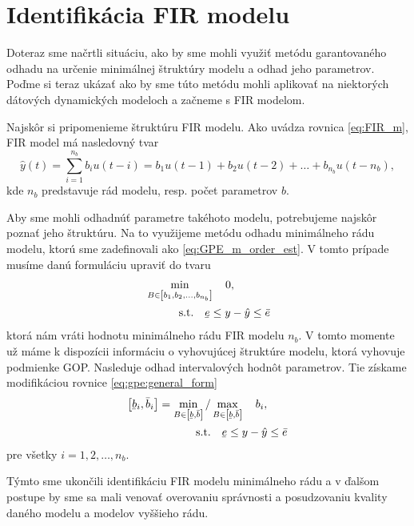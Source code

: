 \section{Identifikácia FIR modelu}
Doteraz sme načrtli situáciu, ako by sme mohli využiť metódu garantovaného odhadu na určenie minimálnej štruktúry modelu a odhad jeho parametrov. Poďme si teraz ukázať ako by sme túto metódu mohli aplikovať na niektorých dátových dynamických modeloch a začneme s FIR modelom.

Najskôr si pripomenieme štruktúru FIR modelu. Ako uvádza rovnica \ref{eq:FIR_m}, FIR model má nasledovný tvar
\begin{equation*}
	\hat{y}(t) = \sum_{i=1}^{n_b} b_{i}u(t-i) = b_{1}u(t-1) + b_{2}u(t-2) + \dots + b_{n_b}u(t-n_b),
\end{equation*}
kde $ n_b $ predstavuje rád modelu, resp. počet parametrov $ b $. 

Aby sme mohli odhadnúť parametre takéhoto modelu, potrebujeme najskôr poznať jeho štruktúru. Na to využijeme metódu odhadu minimálneho rádu modelu, ktorú sme zadefinovali ako \ref{eq:GPE_m_order_est}. V tomto prípade musíme danú formuláciu upraviť do tvaru
\begin{equation}
	\begin{split}
		& \min_{B \in \left[ b_{1}, b_{2}, \dots, b_{n_b} \right]} \quad 0, \\
		& \qquad \quad \text{s.t.} \quad \ubar{e} \leq y - \hat{y} \leq \bar{e}
	\end{split}
\end{equation} 
ktorá nám vráti hodnotu minimálneho rádu FIR modelu $ n_b $. V tomto momente už máme k dispozícii informáciu o vyhovujúcej štruktúre modelu, ktorá vyhovuje podmienke GOP. Nasleduje odhad intervalových hodnôt parametrov. Tie získame modifikáciou rovnice \ref{eq:gpe:general_form}
\begin{equation}
	\begin{split}
		\left[ \ubar{b}_i, \bar{b}_i \right] = \min_{B \in \left[ \ubar{b}, \bar{b} \right]} / &\max_{B \in \left[ \ubar{b}, \bar{b} \right]} \quad b_i,\\
		\text{s.t.}& \quad \ubar{e} \leq y - \hat{y} \leq \bar{e}	
	\end{split}
\end{equation}
pre všetky $ i = 1, 2, \dots, n_b $.  

Týmto sme ukončili identifikáciu FIR modelu minimálneho rádu a v ďalšom postupe by sme sa mali venovať overovaniu správnosti a posudzovaniu kvality daného modelu a modelov vyššieho rádu.

